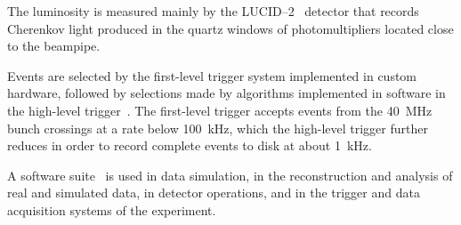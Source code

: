 The luminosity is measured mainly by the LUCID--2~\cite{LUCID2} detector that records Cherenkov light produced in the quartz windows of photomultipliers located close to the beampipe.

Events are selected by the first-level trigger system implemented in custom hardware,
followed by selections made by algorithms implemented in software in the high-level trigger~\cite{TRIG-2016-01}. 
The first-level trigger accepts events from the \qty{40}{\MHz} bunch crossings at a rate below \qty{100}{\kHz},
which the high-level trigger further reduces in order to record complete events to disk at about \qty{1}{\kHz}.

A software suite~\cite{SOFT-2022-02} is used in data simulation, in the reconstruction
and analysis of real and simulated data, in detector operations, and in the trigger and data acquisition
systems of the experiment.

